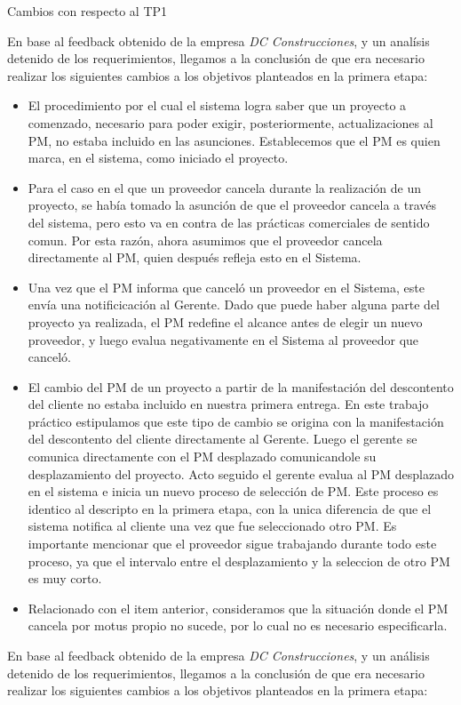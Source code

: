 Cambios con respecto al TP1


En base al feedback obtenido de la empresa \textit{DC Construcciones}, y un analísis detenido de los requerimientos, llegamos a la conclusión de que era necesario realizar los siguientes cambios a los objetivos planteados en la primera etapa:

\begin{itemize}
  \item El procedimiento por el cual el sistema logra saber que un proyecto a comenzado, necesario para poder exigir, posteriormente, actualizaciones al PM, no estaba incluido en las asunciones. Establecemos que el PM es quien marca, en el sistema, como iniciado el proyecto.
  \item Para el caso en el que un proveedor cancela durante la realización de un proyecto, se había tomado la asunción de que el proveedor cancela a través del sistema, pero esto va en contra de las prácticas comerciales de sentido comun. Por esta razón, ahora asumimos que el proveedor cancela directamente al PM, quien después refleja esto en el Sistema.
  \item Una vez que el PM informa que canceló un proveedor en el Sistema, este envía una notificicación al Gerente. Dado que puede haber alguna parte del proyecto ya realizada, el PM redefine el alcance antes de elegir un nuevo proveedor, y luego evalua negativamente en el Sistema al proveedor que canceló.
  \item El cambio del PM de un proyecto a partir de la manifestación del descontento del cliente no estaba incluido en nuestra primera entrega. En este trabajo práctico estipulamos que este tipo de cambio se origina con la manifestación del descontento del cliente directamente al Gerente. Luego el gerente se comunica directamente con el PM desplazado comunicandole su desplazamiento del proyecto. Acto seguido el gerente evalua al PM desplazado en el sistema e inicia un nuevo proceso de selección de PM. Este proceso es identico al descripto en la primera etapa, con la unica diferencia de que el sistema notifica al cliente una vez que fue seleccionado otro PM. Es importante mencionar que el proveedor sigue trabajando durante todo este proceso, ya que el intervalo entre el desplazamiento y la seleccion de otro PM es muy corto.
  \item Relacionado con el item anterior, consideramos que la situación donde el PM cancela por motus propio no sucede, por lo cual no es necesario especificarla.
\end{itemize}
En base al feedback obtenido de la empresa \textit{DC Construcciones}, y un análisis detenido de los requerimientos, llegamos a la conclusión de que era necesario realizar los siguientes cambios a los objetivos planteados en la primera etapa:

